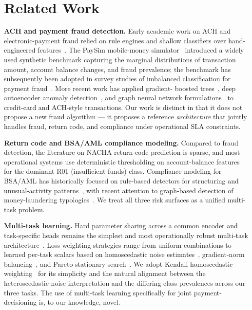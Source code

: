 \documentclass[11pt,a4paper]{article}
\begin{document}
\section{Related Work}
\label{sec:related}

\textbf{ACH and payment fraud detection.} Early academic work on ACH and
electronic-payment fraud relied on rule engines and shallow classifiers over
hand-engineered features~\cite{bhattacharyya2011,bolton2002}. The PaySim
mobile-money simulator~\cite{lopez2016} introduced a widely used synthetic
benchmark capturing the marginal distributions of transaction amount, account
balance changes, and fraud prevalence; the benchmark has subsequently been
adopted in survey studies of imbalanced classification for payment
fraud~\cite{west2016,abdallah2016}. More recent work has applied gradient-
boosted trees~\cite{chen2016}, deep autoencoder anomaly
detection~\cite{schreyer2017}, and graph neural network
formulations~\cite{weber2019} to credit-card and ACH-style transactions.
Our work is distinct in that it does not propose a new fraud algorithm --- it
proposes a reference \textit{architecture} that jointly handles fraud,
return code, and compliance under operational SLA constraints.

\textbf{Return code and BSA/AML compliance modeling.} Compared to
fraud detection, the literature on NACHA return-code prediction is sparse,
and most operational systems use deterministic thresholding on account-balance
features for the dominant R01 (insufficient funds) class. Compliance
modeling for BSA/AML has historically focused on rule-based detectors for
structuring and unusual-activity patterns~\cite{fincen2020}, with recent
attention to graph-based detection of money-laundering
typologies~\cite{weber2019,altman2024}. We treat all three risk surfaces as
a unified multi-task problem.

\textbf{Multi-task learning.} Hard parameter sharing across a common encoder
and task-specific heads remains the simplest and most operationally robust
multi-task architecture~\cite{caruana1997,ruder2017}. Loss-weighting
strategies range from uniform combinations to learned per-task scalars
based on homoscedastic noise estimates~\cite{kendall2018}, gradient-norm
balancing~\cite{chen2018gradnorm}, and Pareto-stationary
search~\cite{sener2018}. We adopt Kendall homoscedastic
weighting~\cite{kendall2018} for its simplicity and the natural alignment
between the heteroscedastic-noise interpretation and the differing class
prevalences across our three tasks. The use of multi-task learning
specifically for joint payment-decisioning is, to our knowledge, novel.
\end{document}
